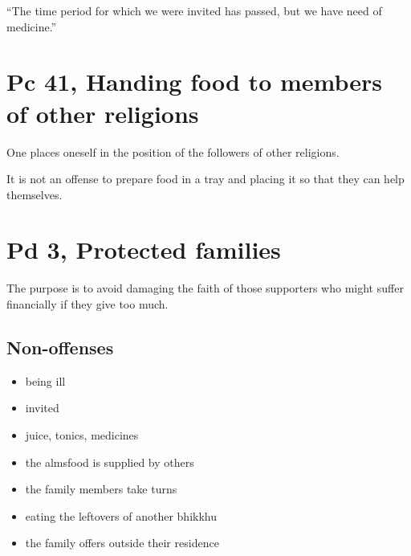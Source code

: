``The time period for which we were invited has passed, but we have need
of medicine.''

\section{Pc 41, Handing food to members of other religions}

One places oneself in the position of the followers of other religions.

It is not an offense to prepare food in a tray and placing it so that
they can help themselves.

\section{Pd 3, Protected families}

The purpose is to avoid damaging the faith of those supporters who might
suffer financially if they give too much.

\subsection{Non-offenses}

\begin{multicols}{2}

\begin{itemize}
\tightlist
\item
  being ill
\item
  invited
\item
  juice, tonics, medicines
\item
  the almsfood is supplied by others
\item
  the family members take turns
\item
  eating the leftovers of another bhikkhu
\item
  the family offers outside their residence
\end{itemize}

\end{multicols}

